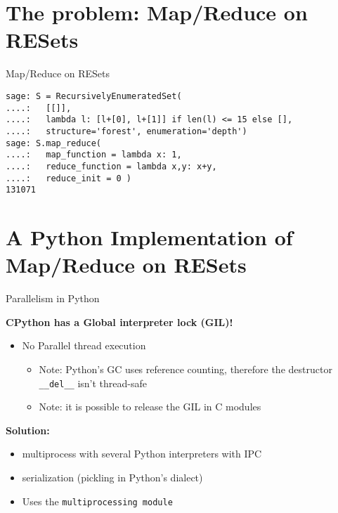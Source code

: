 \documentclass[compress,11pt]{beamer}
\begin{document}
\section{The problem: Map/Reduce on RESets}

\begin{frame}[fragile]{Map/Reduce on RESets}

\begin{verbatim}
sage: S = RecursivelyEnumeratedSet(
....:   [[]],
....:   lambda l: [l+[0], l+[1]] if len(l) <= 15 else [],
....:   structure='forest', enumeration='depth')
sage: S.map_reduce(
....:   map_function = lambda x: 1,
....:   reduce_function = lambda x,y: x+y,
....:   reduce_init = 0 )
131071
\end{verbatim}
\end{frame}



\section{A Python Implementation of Map/Reduce on RESets}

\begin{frame}[fragile]{Parallelism in Python}

\textbf{CPython has a Global interpreter lock (GIL)!}
\bigskip

\begin{itemize}
\item No Parallel thread execution
  \begin{itemize}
  \item Note: Python's GC uses reference counting, therefore the destructor
    \verb+__del__+ isn't thread-safe
  \item Note: it is possible to release the GIL in C modules
  \end{itemize}
\end{itemize}

\pause
\textbf{Solution:}
\begin{itemize}
\item multiprocess with several Python interpreters with IPC
\item serialization (pickling in Python's dialect)
\item Uses the \texttt{multiprocessing module}
\end{itemize}

\end{frame}
\end{document}
